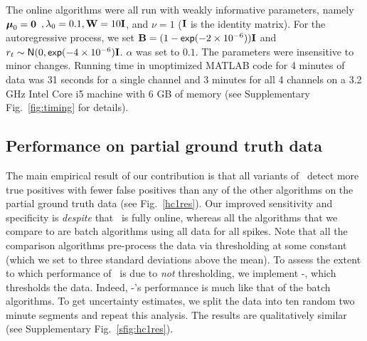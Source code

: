 

The online algorithms were all run with weakly informative parameters, namely  $\boldsymbol{\mu}_0=\boldsymbol{0}$ $,\lambda_0=0.1,\mathbf{W}=10\mathbf{I}$, and $\nu=1$ ($\mathbf{I}$ is the identity matrix).  
For the autoregressive process, we set $\mathbf{B}=(1-\mathsf{exp}(-2\times 10^{-6}))\mathbf{I}$ and $r_t\sim\mathsf{N}(0,\mathsf{exp}(-4\times 10^{-6})\mathbf{I}$.  $\alpha$ was set to $0.1$. The parameters were insensitive to minor changes.  Running time in unoptimized MATLAB code for 4 minutes of data was 31 seconds for a single channel and 3 minutes for all 4 channels on a 3.2 GHz Intel Core i5 machine with 6 GB of memory (see Supplementary Fig.\ \ref{fig:timing} for details).

\subsection{Performance on partial ground truth data}



The main empirical result of our contribution is that all variants of \smug\ detect more true positives with fewer false positives than any of the other algorithms on the partial ground truth data (see Fig.\ \ref{hc1res}).  
Our improved sensitivity and specificity is \emph{despite} that \smug\ is fully online, whereas all the algorithms that we compare to are batch algorithms using all data for all spikes.   Note that all the comparison algorithms pre-process the data via thresholding at some constant (which we set to three standard deviations above the mean).  To assess the extent to which performance of \smug\ is due to \emph{not} thresholding, we implement -\smug, which thresholds the data.  Indeed, -\smug's performance is much like that of the batch algorithms.  To get uncertainty estimates, we split the data into ten random two minute segments and repeat this analysis. The results are qualitatively similar (see Supplementary Fig.\ \ref{sfig:hc1res}).


